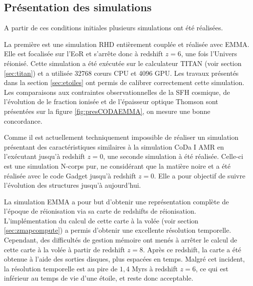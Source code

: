 
\subsection{Présentation des simulations}
\label{sec:presCODA}

A partir de ces conditions initiales plusieurs simulations ont été réalisées.

La première est une simulation \ac{RHD} entièrement couplée et réalisée avec EMMA.
Elle est focalisée sur l'\ac{EoR} et s’arrête donc à redshift $z=6$, une fois l'Univers réionisé.
Cette simulation a été exécutée sur le calculateur TITAN (voir section \ref{sec:titan}) et a utilisée 32768 cœurs \ac{CPU} et 4096 \ac{GPU}.
Les travaux présentés dans la section \ref{sec:etoiles} ont permis de calibrer correctement cette simulation.
Les comparaisons aux contraintes observationnelles de la \ac{SFH} cosmique, de l'évolution de le fraction ionisée et de l'épaisseur optique Thomson sont présentées sur la figure \ref{fig:presCODAEMMA}, on mesure une bonne concordance.

Comme il est actuellement techniquement impossible de réaliser un simulation présentant des caractéristiques similaires à la simulation \ac{CoDa} I \ac{AMR} en l'exécutant jusqu’à redshift $z=0$, une seconde simulation à été réalisée.
Celle-ci est une simulation N-corps pur, ne considérant que la matière noire et a été réalisée avec le code Gadget \citep{springel_cosmological_2005} jusqu'à redshift $z=0$.
Elle a pour objectif de suivre l'évolution des structures jusqu'à aujourd'hui.

La simulation EMMA a pour but d'obtenir une représentation complète de l'époque de réionisation via sa carte de redshifts de réionisation.
L'implémentation du calcul de cette carte à la volée (voir section \ref{sec:zmapcompute}) a permis d'obtenir une excellente résolution temporelle.
Cependant, des difficultés de gestion mémoire ont menés à arrêter le calcul de cette carte à la volée à partir de redshift $z=8$.
Après ce redshift, la carte a été obtenue à l'aide des sorties disques, plus espacées en temps.
Malgré cet incident, la résolution temporelle est au pire de $1,4$ Myrs à redshift $z=6$, ce qui est inférieur au temps de vie d'une étoile, et reste donc acceptable.


